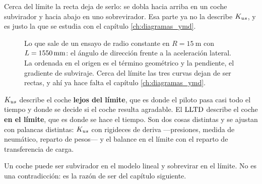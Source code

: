 Cerca del límite la recta deja de serlo: se dobla hacia arriba en un coche
subvirador y hacia abajo en uno sobrevirador. Esa parte ya no la describe
$K_{us}$, y es justo la que se estudia con el capítulo \ref{ch:diagramas_ymd}.

\begin{figure}[htbp]
\centering
{}
\caption[Ensayo de radio constante]{Lo que sale de un ensayo de radio constante
en $R = \SI{15}{\meter}$ con $L = \SI{1550}{\milli\meter}$: el ángulo de
dirección frente a la aceleración lateral. La ordenada en el origen es el
término geométrico y la pendiente, el gradiente de subviraje. Cerca del límite
las tres curvas dejan de ser rectas, y ahí ya hace falta el capítulo
\ref{ch:diagramas_ymd}.}
\label{fig:estacionario:kus}
\end{figure}

\begin{clave}
$K_{us}$ describe el coche \textbf{lejos del límite}, que es donde el piloto pasa
casi todo el tiempo y donde se decide si el coche resulta agradable. El $\mathrm{LLTD}$
describe el coche \textbf{en el límite}, que es donde se hace el tiempo. Son
dos cosas distintas y se ajustan con palancas distintas: $K_{us}$ con rigideces
de deriva ---presiones, medida de neumático, reparto de pesos--- y el balance
en el límite con el reparto de transferencia de carga.

Un coche puede ser subvirador en el modelo lineal y sobrevirar en el límite. No
es una contradicción: es la razón de ser del capítulo siguiente.
\end{clave}


